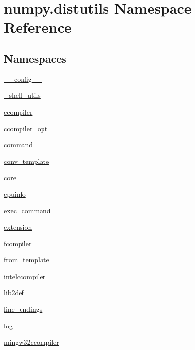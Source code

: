 \hypertarget{namespacenumpy_1_1distutils}{}\section{numpy.\+distutils Namespace Reference}
\label{namespacenumpy_1_1distutils}
\subsection*{Namespaces}
\begin{DoxyCompactItemize}
\item 
 \hyperlink{namespacenumpy_1_1distutils_1_1____config____}{\+\_\+\+\_\+config\+\_\+\+\_\+}
\item 
 \hyperlink{namespacenumpy_1_1distutils_1_1__shell__utils}{\+\_\+shell\+\_\+utils}
\item 
 \hyperlink{namespacenumpy_1_1distutils_1_1ccompiler}{ccompiler}
\item 
 \hyperlink{namespacenumpy_1_1distutils_1_1ccompiler__opt}{ccompiler\+\_\+opt}
\item 
 \hyperlink{namespacenumpy_1_1distutils_1_1command}{command}
\item 
 \hyperlink{namespacenumpy_1_1distutils_1_1conv__template}{conv\+\_\+template}
\item 
 \hyperlink{namespacenumpy_1_1distutils_1_1core}{core}
\item 
 \hyperlink{namespacenumpy_1_1distutils_1_1cpuinfo}{cpuinfo}
\item 
 \hyperlink{namespacenumpy_1_1distutils_1_1exec__command}{exec\+\_\+command}
\item 
 \hyperlink{namespacenumpy_1_1distutils_1_1extension}{extension}
\item 
 \hyperlink{namespacenumpy_1_1distutils_1_1fcompiler}{fcompiler}
\item 
 \hyperlink{namespacenumpy_1_1distutils_1_1from__template}{from\+\_\+template}
\item 
 \hyperlink{namespacenumpy_1_1distutils_1_1intelccompiler}{intelccompiler}
\item 
 \hyperlink{namespacenumpy_1_1distutils_1_1lib2def}{lib2def}
\item 
 \hyperlink{namespacenumpy_1_1distutils_1_1line__endings}{line\+\_\+endings}
\item 
 \hyperlink{namespacenumpy_1_1distutils_1_1log}{log}
\item 
 \hyperlink{namespacenumpy_1_1distutils_1_1mingw32ccompiler}{mingw32ccompiler}
\item 

\end{DoxyCompactItemize}
